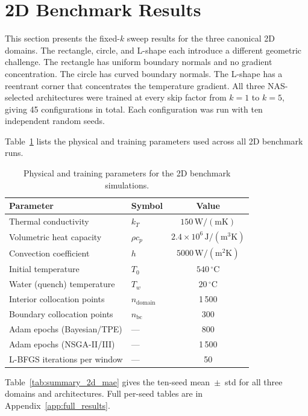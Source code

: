 \section{2D Benchmark Results}
\label{sec:results_2d}

This section presents the fixed-$k$ sweep results for the three canonical 2D
domains.
The rectangle, circle, and L-shape each introduce a different geometric
challenge.
The rectangle has uniform boundary normals and no gradient concentration.
The circle has curved boundary normals.
The L-shape has a reentrant corner that concentrates the temperature gradient.
All three NAS-selected architectures were trained at every skip factor from
$k=1$ to $k=5$, giving 45 configurations in total.
Each configuration was run with ten independent random seeds.

Table~\ref{tab:2d_params} lists the physical and training parameters used
across all 2D benchmark runs.

\begin{table}[H]
\centering
\caption{Physical and training parameters for the 2D benchmark simulations.}
\label{tab:2d_params}
\small
\begin{tabular}{llc}
\toprule
Parameter & Symbol & Value \\
\midrule
Thermal conductivity        & $k_T$               & $150\,\mathrm{W/(mK)}$ \\
Volumetric heat capacity    & $\rho c_p$          & $2.4\times10^6\,\mathrm{J/(m^3K)}$ \\
Convection coefficient      & $h$                 & $5000\,\mathrm{W/(m^2K)}$ \\
Initial temperature         & $T_0$               & $540\,^\circ\mathrm{C}$ \\
Water (quench) temperature  & $T_w$               & $20\,^\circ\mathrm{C}$ \\
\midrule
Interior collocation points & $n_\mathrm{domain}$ & 1\,500 \\
Boundary collocation points & $n_\mathrm{bc}$     & 300 \\
Adam epochs (Bayesian/TPE)  & ---                 & 800 \\
Adam epochs (NSGA-II/III)   & ---                 & 1\,500 \\
L-BFGS iterations per window& ---                 & 50 \\
\bottomrule
\end{tabular}
\end{table}

Table~\ref{tab:summary_2d_mae} gives the ten-seed mean~$\pm$~std for all three
domains and architectures.
Full per-seed tables are in Appendix~\ref{app:full_results}.

